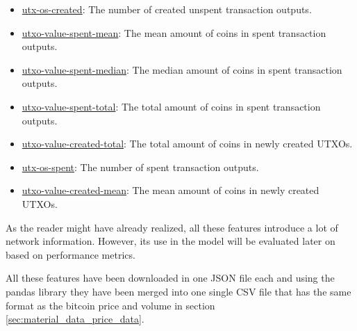 \begin{itemize}
    \begin{itemize}
        \item \href{https://studio.glassnode.com/metrics?a=BTC&m=blockchain.UtxoCreatedCount}{utx-os-created}: The number of created unspent transaction outputs.
        \item \href{https://studio.glassnode.com/metrics?a=BTC&m=blockchain.UtxoSpentValueMean}{utxo-value-spent-mean}: The mean amount of coins in spent transaction outputs.
        \item \href{https://studio.glassnode.com/metrics?a=BTC&m=blockchain.UtxoSpentValueMedian}{utxo-value-spent-median}: The median amount of coins in spent transaction outputs.
        \item \href{https://studio.glassnode.com/metrics?a=BTC&m=blockchain.UtxoSpentValueSum}{utxo-value-spent-total}: The total amount of coins in spent transaction outputs.
        \item \href{https://studio.glassnode.com/metrics?a=BTC&m=blockchain.UtxoCreatedValueSum}{utxo-value-created-total}: The total amount of coins in newly created UTXOs.
        \item \href{https://studio.glassnode.com/metrics?a=BTC&m=blockchain.UtxoSpentCount}{utx-os-spent}: The number of spent transaction outputs.
        \item \href{https://studio.glassnode.com/metrics?a=BTC&m=blockchain.UtxoCreatedValueMean}{utxo-value-created-mean}: The mean amount of coins in newly created UTXOs.
    \end{itemize}
\end{itemize}

As the reader might have already realized, all these features introduce a lot of network information. However, its use in the model will be evaluated later on based on performance metrics.

All these features have been downloaded in one JSON file each and using the pandas library they have been merged into one single CSV file that has the same format as the bitcoin price and volume in section \ref{sec:material_data_price_data}.